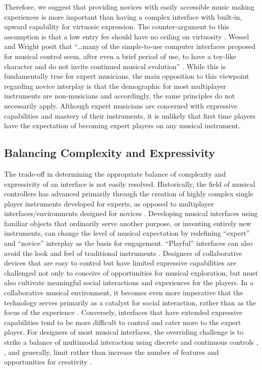 Therefore, we suggest that providing novices with easily accessible music making
experiences is more important than having a complex interface with built-in,
upward capability for virtuosic expression. The counter-argument to this
assumption is that a low entry fee should have no ceiling on virtuosity \cite{Wessel:2001}.
Wessel and Wright posit that ``\ldots{}many of the simple-to-use computer
interfaces proposed for musical control seem, after even a brief period of use,
to have a toy-like character and do not invite continued musical evolution'' \cite{Wessel:2001}. 
While this is fundamentally true for expert musicians, the main opposition to
this viewpoint regarding novice interplay is that the demographic for most
multiplayer instruments are non-musicians and accordingly, the same principles do
not necessarily apply.  Although expert musicians are concerned with expressive
capabilities and mastery of their instruments, it is unlikely that first time
players have the expectation of becoming expert players on any musical
instrument.

\subsection{Balancing Complexity and Expressivity }

The trade-off in determining the appropriate balance of complexity and
expressivity of an interface is not easily resolved.  Historically, the field of
musical controllers has advanced primarily through the creation of highly complex
single player instruments developed for experts, as opposed to multiplayer
interfaces/environments designed for novices \cite{Cutler:2000,Paradiso:1997a}. Developing musical
interfaces using familiar objects that ordinarily serve another purpose, or
inventing entirely new instruments, can change the level of musical expectation
by redefining ``expert'' and ``novice'' interplay as the basis for engagement.
``Playful'' interfaces can also avoid the look and feel of traditional instruments
 \cite{Cook:2001}.  Designers of collaborative devices that are easy to control but have
limited expressive capabilities are challenged not only to conceive of
opportunities for musical exploration, but must also cultivate meaningful social
interactions and experiences for the players. In a collaborative musical
environment, it becomes even more imperative that the technology serves primarily
as a catalyst for social interaction, rather than as the focus of the experience
 \cite{Robson:2001}. Conversely, interfaces that have extended expressive capabilities tend to be
more difficult to control and cater more to the expert player. For designers of
most musical interfaces, the overriding challenge is to strike a balance of
multimodal interaction using discrete and continuous controls \cite{Tanaka:2002}, \cite{Verplank:2001}, and
generally, limit rather than increase the number of features and opportunities
for creativity \cite{Cook:2001}.


